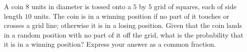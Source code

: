 A coin $8$ units in diameter is tossed onto a $5$ by $5$ grid of squares, each of side length $10$ units. The coin is in a winning position if no part of it touches or crosses a grid line; otherwise it is in a losing position. Given that the coin lands in a random position with no part of it off the grid, what is the probability that it is in a winning position? Express your answer as a common fraction.
